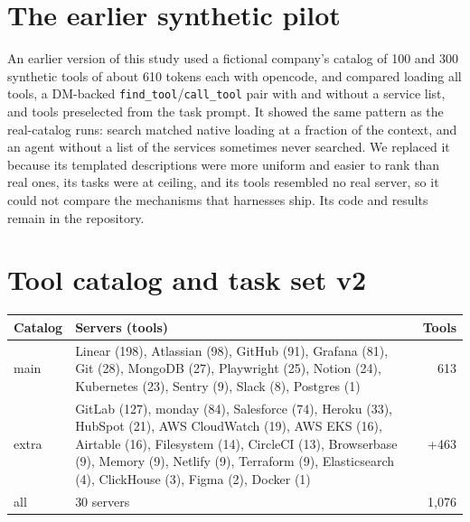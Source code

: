\documentclass[11pt]{article}
\begin{document}
\section{The earlier synthetic pilot}\label{app:synthetic}
An earlier version of this study used a fictional company's catalog of 100 and 300 synthetic tools of about 610
tokens each with opencode, and compared loading all tools, a DM-backed \texttt{find\_tool}/\texttt{call\_tool}
pair with and without a service list, and tools preselected from the task prompt. It showed the same pattern as
the real-catalog runs: search matched native loading at a fraction of the context, and an agent without a list of
the services sometimes never searched. We replaced it because its templated descriptions were more uniform and
easier to rank than real ones, its tasks were at ceiling, and its tools resembled no real server, so it could not
compare the mechanisms that harnesses ship. Its code and results remain in the repository.

\clearpage
\section{Tool catalog and task set v2}\label{app:catalog}\label{app:tasks}
{\centering\footnotesize
{}
\label{tab:catalog}
\setlength{\tabcolsep}{3.5pt}
\begin{tabularx}{\linewidth}{@{}l X r@{}}
\toprule
Catalog & Servers (tools) & Tools \\
\midrule
main & Linear (198), Atlassian (98), GitHub (91), Grafana (81), Git (28), MongoDB (27), Playwright (25), Notion (24),
Kubernetes (23), Sentry (9), Slack (8), Postgres (1) & 613 \\
extra & GitLab (127), monday (84), Salesforce (74), Heroku (33), HubSpot (21), AWS CloudWatch (19), AWS EKS (16),
Airtable (16), Filesystem (14), CircleCI (13), Browserbase (9), Memory (9), Netlify (9), Terraform (9),
Elasticsearch (4), ClickHouse (3), Figma (2), Docker (1) & +463 \\
\midrule
all & 30 servers & 1{,}076 \\
\bottomrule
\end{tabularx}
\par}
\bigskip
{\small

}
\end{document}
